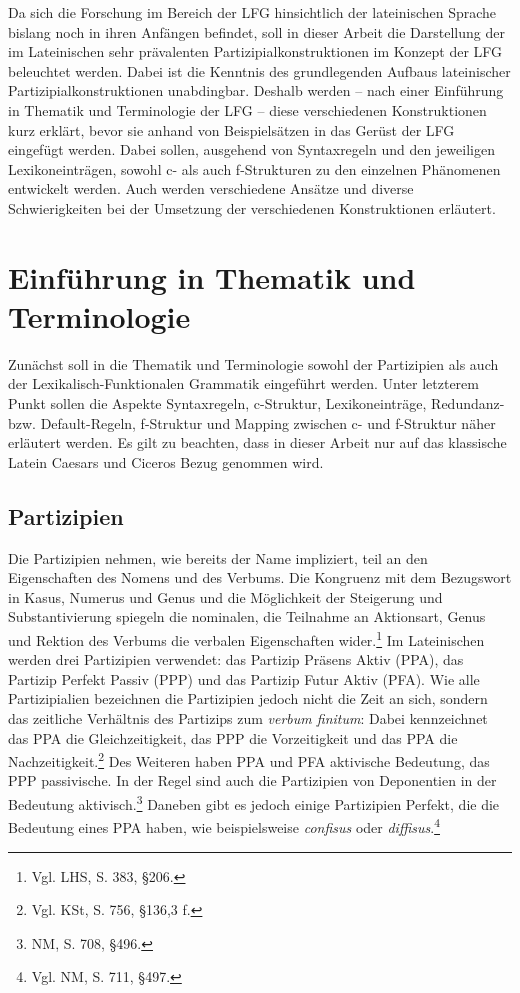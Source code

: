 \documentclass[12pt,a4paper]{article}
\begin{document}
Da sich die Forschung im Bereich der LFG hinsichtlich der lateinischen Sprache bislang noch in ihren Anfängen befindet, soll in dieser Arbeit die Darstellung der im Lateinischen sehr prävalenten Partizipialkonstruktionen im Konzept der LFG beleuchtet werden. Dabei ist die Kenntnis des grundlegenden Aufbaus lateinischer Partizipialkonstruktionen unabdingbar. Deshalb werden -- nach einer Einführung in Thematik und Terminologie der LFG -- diese verschiedenen Konstruktionen kurz erklärt, bevor sie anhand von Beispielsätzen in das Gerüst der LFG eingefügt werden. Dabei sollen, ausgehend von Syntaxregeln und den jeweiligen Lexikoneinträgen, sowohl c- als auch f-Strukturen zu den einzelnen Phänomenen entwickelt werden. Auch werden verschiedene Ansätze und diverse Schwierigkeiten bei der Umsetzung der verschiedenen Konstruktionen erläutert.

\section{Einführung in Thematik und Terminologie}
Zunächst soll in die Thematik und Terminologie sowohl der Partizipien als auch der Lexikalisch-Funktionalen Grammatik eingeführt werden. Unter letzterem Punkt sollen die Aspekte Syntaxregeln, c-Struktur, Lexikoneinträge, Redundanz- bzw. Default-Regeln, f-Struktur und Mapping zwischen c- und f-Struktur näher erläutert werden. Es gilt zu beachten, dass in dieser Arbeit nur auf das klassische Latein Caesars und Ciceros Bezug genommen wird. 

\subsection{Partizipien}
Die Partizipien nehmen, wie bereits der Name impliziert, teil an den Eigenschaften des Nomens und des Verbums. Die Kongruenz mit dem Bezugswort in Kasus, Numerus und Genus und die Möglichkeit der Steigerung und Substantivierung spiegeln die nominalen, die Teilnahme an Aktionsart, Genus und Rektion des Verbums die verbalen Eigenschaften wider.\footnote{Vgl. LHS, S. 383, §206.}
Im Lateinischen werden drei Partizipien verwendet: das Partizip Präsens Aktiv (PPA), das Partizip Perfekt Passiv (PPP) und das Partizip Futur Aktiv (PFA).
Wie alle Partizipialien bezeichnen die Partizipien jedoch nicht die Zeit an sich, sondern das zeitliche Verhältnis des Partizips zum \textit{verbum finitum}: Dabei kennzeichnet das PPA die Gleichzeitigkeit, das PPP die Vorzeitigkeit und das PPA die Nachzeitigkeit.\footnote{Vgl. KSt, S. 756, §136,3 f.}
Des Weiteren haben PPA und PFA aktivische Bedeutung, das PPP passivische. In der Regel sind auch die Partizipien von Deponentien in der Bedeutung aktivisch.\footnote{NM, S. 708, §496.} Daneben gibt es jedoch einige Partizipien Perfekt, die die Bedeutung eines PPA haben, wie beispielsweise \textit{confisus} oder \textit{diffisus}.\footnote{Vgl. NM, S. 711, §497.}
\end{document}
